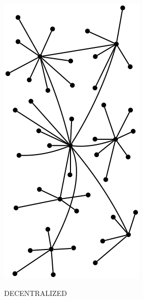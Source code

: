 %

\begin{marginfigure}
  \includegraphics[width=0.6\linewidth]{../../FIGURES/Baran-Decentralized.png}
  \caption{DECENTRALIZED}
    \vspace{12pt}
\end{marginfigure}



